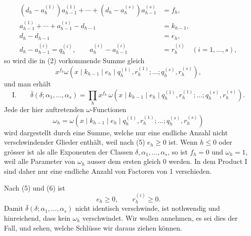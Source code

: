 \begin{align}
(d_h-a_h^{(1)})a_{h-1}^{(1)}+\cdots+(d_h-a_h^{(s)})a_{h-1}^{(s)}&=f_h,
\tag{3}\\
a_{h-1}^{(1)}+\cdots+a_{h-1}^{(s)}-d_{h-1}&=k_{h-1},
\tag{4}\\
d_h-d_{h-1}&=e_h,
\tag{5}\\
d_h-a_{h-1}^{(i)}=q_h^{(i)},\qquad a_h^{(i)}-a_{h-1}^{(i)}&=r_h^{(i)}\quad(i=1,\ldots,s),
\tag{6}
\end{align}
so wird die in (2) vorkommende Summe gleich
\[
 x^{f_h}\omega(x\mid k_{h-1}\mid e_h\mid q_h^{(1)},r_h^{(1)};\ldots;q_h^{(s)},r_h^{(s)}),
\]
und man erhält
\[
\text{I.}\qquad
 \bar\delta(\delta;\alpha_1,
\ldots,\alpha_s)=\prod_h x^{f_h}\,
 \omega(x\mid k_{h-1}\mid e_h\mid q_h^{(1)},r_h^{(1)};\ldots;q_h^{(s)},r_h^{(s)}).
\]
Jede der hier auftretenden $\omega$-Functionen
\begin{equation}
 \omega_h=\omega(x\mid k_{h-1}\mid e_h\mid q_h^{(1)},r_h^{(1)};\ldots;q_h^{(s)},r_h^{(s)})
\tag{7}
\end{equation}
wird dargestellt durch eine Summe, welche nur eine endliche Anzahl nicht verschwindender Glieder enthält, weil nach (5) $e_h\ge0$ ist. Wenn $h\le0$ oder grösser ist als alle Exponenten der Classen $\delta,\alpha_1,\ldots,
\alpha_s$, so ist $f_h=0$ und $\omega_h=1$, weil alle Parameter von $\omega_h$ ausser dem ersten gleich 0 werden. In dem Product I sind daher nur eine endliche Anzahl von Factoren von 1 verschieden.

Nach (5) und (6) ist
\begin{equation}
 e_h\ge0,
 \qquad r_h^{(i)}\ge0.
\tag{8}
\end{equation}
Damit $\bar\delta(\delta;\alpha_1,
\ldots,\alpha_s)$ nicht identisch verschwinde, ist nothwendig und hinreichend, dass kein $\omega_h$ verschwindet. Wir wollen annehmen, es sei dies der Fall, und sehen, welche Schlüsse wir daraus ziehen können.


